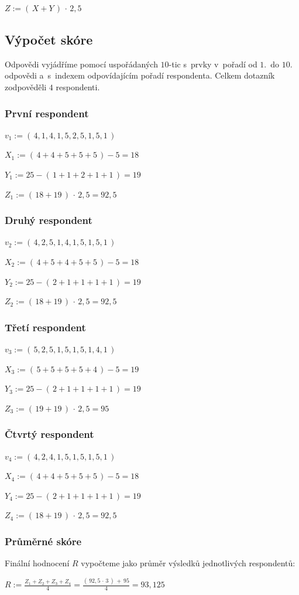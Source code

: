 \documentclass[12pt,a4paper]{report}
\let\openright=\clearpage
\begin{document}
$Z := ( \,X + Y\,)\,\cdot\,2,5$

\subsection{Výpočet skóre}

Odpovědi vyjádříme pomocí uspořádaných $10$-tic s~prvky v~pořadí od $1$.~do $10$. odpovědi a~s~indexem odpovídajícím pořadí respondenta. Celkem dotazník zodpověděli $4$ respondenti.

\subsubsection{První respondent}

$v_1 := (\,4,1,4,1,5,2,5,1,5,1\,)$

$X_1 := (\,4 + 4 + 5 + 5 + 5\,) - 5 = 18\,$

$Y_1 := 25 - (\,1 + 1 + 2 + 1 + 1\,) = 19\,$

$Z_1 := ( \,18 + 19\,)\,\cdot\,2,5 = 92,5$

\subsubsection{Druhý respondent}

$v_2 := (\,4,2,5,1,4,1,5,1,5,1\,)$

$X_2 := (\,4 + 5 + 4 + 5 + 5\,) - 5 = 18\,$

$Y_2 := 25 - (\,2 + 1 + 1 + 1 + 1\,) = 19\,$

$Z_2 := ( \,18 + 19\,)\,\cdot\,2,5 = 92,5$

\subsubsection{Třetí respondent}

$v_3 := (\,5,2,5,1,5,1,5,1,4,1\,)$

$X_3 := (\,5 + 5 + 5 + 5 + 4\,) - 5 = 19\,$

$Y_3 := 25 - (\,2 + 1 + 1 + 1 + 1\,) = 19\,$

$Z_3 := ( \,19 + 19\,)\,\cdot\,2,5 = 95$

\subsubsection{Čtvrtý respondent}

$v_4 := (\,4,2,4,1,5,1,5,1,5,1\,)$

$X_4 := (\,4 + 4 + 5 + 5 + 5\,) - 5 = 18\,$

$Y_4 := 25 - (\,2 + 1 + 1 + 1 + 1\,) = 19\,$

$Z_4 := ( \,18 + 19\,)\,\cdot\,2,5 = 92,5$

\subsubsection{Průměrné skóre}

Finální hodnocení $R$ vypočteme jako průměr výsledků jednotlivých respondentů:

$R := \frac{Z_1 + Z_2 + Z_3 + Z_4}{4} = \frac{(\,92,5\,\cdot\,3\,)\,+\,95}{4} = 93,125$

\openright
\end{document}
